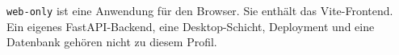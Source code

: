 \begin{beginnerstatement}

\texttt{web-only} ist eine Anwendung für den Browser. Sie enthält das
Vite-Frontend. Ein eigenes FastAPI-Backend, eine Desktop-Schicht, Deployment
und eine Datenbank gehören nicht zu diesem Profil.

\end{beginnerstatement}
